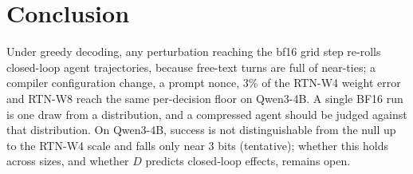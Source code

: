 \section{Conclusion}
\label{sec:conclusion}

Under greedy decoding, any perturbation reaching the bf16 grid step re-rolls closed-loop agent trajectories, because free-text turns are full of near-ties; a compiler configuration change, a prompt nonce, 3\% of the RTN-W4 weight error and RTN-W8 reach the same per-decision floor on Qwen3-4B. A single BF16 run is one draw from a distribution, and a compressed agent should be judged against that distribution. On Qwen3-4B, success is not distinguishable from the null up to the RTN-W4 scale and falls only near 3 bits (tentative); whether this holds across sizes, and whether $D$ predicts closed-loop effects, remains open.
